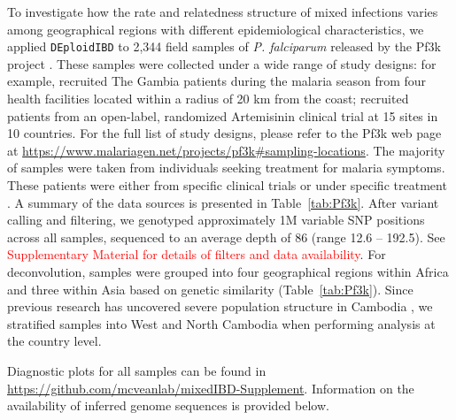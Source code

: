 \documentclass[9pt,lineno]{elife}
\begin{document}
To investigate how the rate and relatedness structure of mixed infections varies among geographical regions with different epidemiological characteristics, we applied \texttt{DEploidIBD} to 2,344 field samples of {\it P. falciparum} released by the Pf3k project \citep{pf3k}.  These samples were collected under a wide range of study designs: for example, \citet{Amambua-Ngwa2012} recruited The Gambia patients during the malaria season from four health facilities located within a radius of 20 km from the coast; \citet{Ashley2014} recruited patients from an open-label, randomized Artemisinin clinical trial at 15 sites in 10 countries. For the full list of study designs, please refer to the Pf3k web page at \url{https://www.malariagen.net/projects/pf3k#sampling-locations}. The majority of samples were taken from individuals seeking treatment for malaria symptoms. These patients were either from specific clinical trials \citep{Ocholla2014} or under specific treatment \citep{Duffy2015, Miotto2013, eLife2016}.  A summary of the data sources is presented in Table~\ref{tab:Pf3k}.  After variant calling and filtering, we genotyped approximately 1M variable SNP positions across all samples, sequenced to an average depth of 86 (range 12.6 -- 192.5).  See \textcolor{red}{Supplementary Material for details of filters and data availability}.  For deconvolution, samples were grouped into four geographical regions within Africa and three within Asia based on genetic similarity (Table~\ref{tab:Pf3k}). Since previous research has uncovered severe population structure in Cambodia \citep{Miotto2013}, we stratified samples into West and North Cambodia when performing analysis at the country level.

Diagnostic plots for all samples can be found in \url{https://github.com/mcveanlab/mixedIBD-Supplement}. Information on the availability of inferred genome sequences is provided below.
\end{document}
